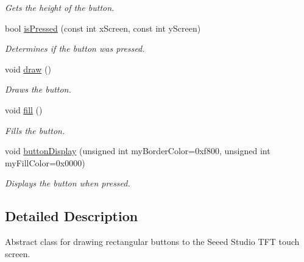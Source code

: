\begin{DoxyCompactItemize}
\begin{DoxyCompactList}\small\item\em Gets the height of the button. \end{DoxyCompactList}\item 
bool \hyperlink{class_button_a2da26aebe4d13bb3f930dab9a1361222}{is\+Pressed} (const int x\+Screen, const int y\+Screen)
\begin{DoxyCompactList}\small\item\em Determines if the button was pressed. \end{DoxyCompactList}\item 
\hypertarget{class_button_a0380207dc9e4edcd0272207a39c7cdeb}{void \hyperlink{class_button_a0380207dc9e4edcd0272207a39c7cdeb}{draw} ()}\label{class_button_a0380207dc9e4edcd0272207a39c7cdeb}

\begin{DoxyCompactList}\small\item\em Draws the button. \end{DoxyCompactList}\item 
\hypertarget{class_button_a4b365dabfed0a4664979bb2087b5dd4a}{void \hyperlink{class_button_a4b365dabfed0a4664979bb2087b5dd4a}{fill} ()}\label{class_button_a4b365dabfed0a4664979bb2087b5dd4a}

\begin{DoxyCompactList}\small\item\em Fills the button. \end{DoxyCompactList}\item 
void \hyperlink{class_button_ad2122745381c7a5366d9514ba34daee6}{button\+Display} (unsigned int my\+Border\+Color=0xf800, unsigned int my\+Fill\+Color=0x0000)
\begin{DoxyCompactList}\small\item\em Displays the button when pressed. \end{DoxyCompactList}\end{DoxyCompactItemize}


\subsection{Detailed Description}
Abstract class for drawing rectangular buttons to the Seeed Studio T\+F\+T touch screen. 

